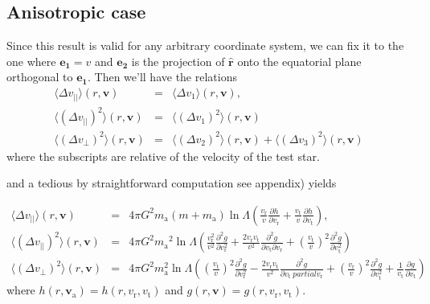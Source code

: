 \documentclass[11pt]{article}
\newcommand{\rt}{\mathrm{t}}
\newcommand{\rr}{\mathrm{r}}
\newcommand{\vr}{v_{\rr}}
\newcommand{\vt}{v_{\rt}}
\newcommand{\bv}{\boldsymbol{v}}
\newcommand{\br}{\boldsymbol{r}}
\newcommand{\hr}{\hat{\br}}
\newcommand{\ra}{\mathrm{a}}
\newcommand{\va}{v_{\ra}}
\newcommand{\dvPar}{\Delta v_{||}}
\newcommand{\dvPerp}{\Delta v_{\perp}}
\newcommand{\dvParAvrLoc}{\langle \dvPar \rangle}
\newcommand{\dvParSqAvrLoc}{\langle(\dvPar)^{2}\rangle}
\newcommand{\dvPerpSqAvrLoc}{\langle(\dvPerp)^{2}\rangle}
\newcommand{\bva}{\boldsymbol{\va}}
\newcommand{\ma}{m_{\ra}}
\newcommand{\e}[1]{\boldsymbol{e_{#1}}}
\begin{document}
\subsection{Anisotropic case}
\label{subsec:Aniso}

Since this result is valid for any arbitrary coordinate system, we
can fix it to the one where $\e1=\hat{v}$ and $\e2$ is the projection
of $\hr$ onto the equatorial plane orthogonal to $\e1$. Then
we'll have the relations
\begin{equation}
\begin{array}{ccl}
  \dvParAvrLoc(r,\bv) & =&\displaystyle{\langle\Delta v_{1}\rangle(r,\bv)} ,\\
  
  \dvParSqAvrLoc(r,\bv) & = &\displaystyle{\langle(\Delta v_{1})^{2}\rangle(r,\bv)}\\
  
  \dvPerpSqAvrLoc(r,\bv) & = &\displaystyle{\langle(\Delta v_{2})^{2}\rangle(r,\bv)+\langle(\Delta v_{3})^{2}\rangle(r,\bv)}
\end{array}
\label{eq:TestStarDeflection}
\end{equation}
where the subscripts are relative of the velocity of the test star.

and a tedious by straightforward computation see appendix) yields

\begin{equation}
\begin{array}{ccl}
  \dvParAvrLoc(r,\bv) & =&\displaystyle{4\pi G^{2}\ma(m+\ma)\ln\Lambda(\frac{\vr}{v}\frac{\partial h}{\partial \vr}+\frac{\vt}{v}\frac{\partial h}{\partial \vt})} ,\\
  
  \dvParSqAvrLoc(r,\bv) & = &\displaystyle{4\pi G^{2}{\ma}^{2}\ln\Lambda\left(\frac{\vr^{2}}{v^{2}}\frac{\partial^{2}g}{\partial \vr^{2}}+\frac{2\vr\vt}{v^{2}}\frac{\partial^{2}g}{\partial \vt\partial \vr}+\left(\frac{\vt}{v}\right)^{2}\frac{\partial^{2}g}{\partial \vt^{2}}\right)}\\
  
  \dvPerpSqAvrLoc(r,\bv) & = &\displaystyle{4\pi G^{2}\ma^{2}\ln\Lambda\left(\left(\frac{\vt}{v}\right)^{2}\frac{\partial^{2}g}{\partial \vr^{2}}-\frac{2\vr\vt}{v^{2}}\frac{\partial^{2}g}{\partial \vt\ partial \vr}+\left(\frac{\vr}{v}\right)^{2}\frac{\partial^{2}g}{\partial \vt^{2}}+\frac{1}{\vt}\frac{\partial g}{\partial \vt}\right)}   
\end{array}
\label{eq:AnisoLocDiffCoefsdRdT}
\end{equation}
where $h(r,\bva)=h(r,\vr,\vt)$ and $g(r,\bv)=g(r,\vr,\vt)$.
\end{document}
